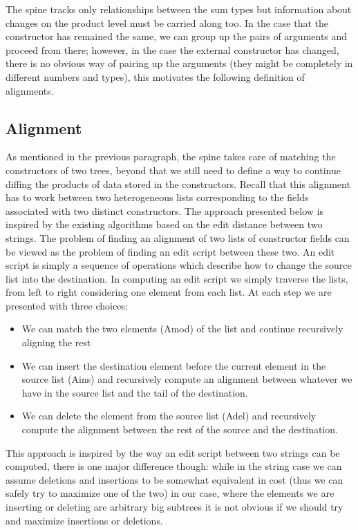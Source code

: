 \documentclass[11pt]{article}
\begin{document}
The spine tracks only relationships between the sum types but information
about changes on the product level must be carried along too. In the
case that the constructor has remained the same, we can group up the
pairs of arguments and proceed from there; however, in the case the
external constructor has changed, there is no obvious way of pairing up
the arguments (they might be completely in different numbers and types), this 
motivates the following definition of alignments.

\subsection{Alignment}\label{alignment}

As mentioned in the previous paragraph, the spine takes care of matching
the constructors of two trees, beyond that we still need to define a way
to continue diffing the products of data stored in the constructors.
Recall that this alignment has to work between two heterogeneous lists
corresponding to the fields associated with two distinct constructors.
The approach presented below is inspired by the existing algorithms
based on the edit distance between two strings. The problem of finding
an alignment of two lists of constructor fields can be viewed as the
problem of finding an edit script between these two. An edit script is
simply a sequence of operations which describe how to change the source
list into the destination. In computing an edit script we simply
traverse the lists, from left to right considering one element from each
list. At each step we are presented with three choices:

\begin{itemize}
\item
  We can match the two elements (Amod) of the list and continue
  recursively aligning the rest
\item
  We can insert the destination element before the current element in
  the source list (Ains) and recursively compute an alignment between
  whatever we have in the source list and the tail of the destination.
\item
  We can delete the element from the source list (Adel) and recursively
  compute the alignment between the rest of the source and the
  destination.
\end{itemize}

This approach is inspired by the way an edit script between two strings
can be computed, there is one major difference though: while in the
string case we can assume deletions and insertions to be somewhat
equivalent in cost (thus we can safely try to maximize one of the two)
in our case, where the elements we are inserting or deleting are
arbitrary big subtrees it is not obvious if we should try and maximize
insertions or deletions.
\end{document}
